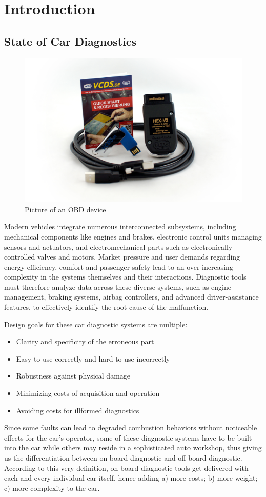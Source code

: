 \section{Introduction}
\subsection{State of Car Diagnostics}
\begin{figure}[ht]
  \centering
  \includegraphics[width=0.95\linewidth]{figures/obd_device.jpg}
  \caption{Picture of an OBD device}
  \label{fig:obd}
\end{figure}
Modern vehicles integrate numerous interconnected subsystems, including mechanical components like engines and brakes, 
electronic control units managing sensors and actuators, and electromechanical parts such as electronically controlled valves and motors. 
Market pressure and user demands regarding energy efficiency, comfort and passenger safety lead to an over-increasing complexity in the systems themselves and their interactions.
Diagnostic tools must therefore analyze data across these diverse systems, such as engine management, braking systems, airbag controllers, 
and advanced driver-assistance features, to effectively identify the root cause of the malfunction.

Design goals for these car diagnostic systems are multiple:
\begin{itemize}
  \item Clarity and specificity of the erroneous part
  \item Easy to use correctly and hard to use incorrectly
  \item Robustness against physical damage
  \item Minimizing costs of acquisition and operation
  \item Avoiding costs for illformed diagnostics
\end{itemize}
Since some faults can lead to degraded combustion behaviors without noticeable effects for the car’s operator, 
some of these diagnostic systems have to be built into the car while others may reside in a sophisticated auto workshop, 
thus giving us the differentiation between on-board diagnostic and off-board diagnostic. 
According to this very definition, on-board diagnostic tools get delivered with each and every individual car itself, hence adding a) more costs; b) more weight; c) more complexity to the car.

